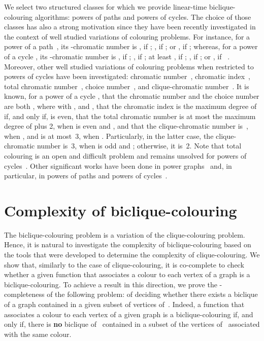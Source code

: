 \documentclass{article}
\begin{document}
We select two structured
classes for which we provide linear-time biclique-colouring algorithms:
powers of paths and powers of cycles. The choice of those classes has also
a strong motivation since they have been recently investigated in the context of
well studied variations of colouring problems. 
For instance, for a power of a path~, its -chromatic number is , if ; , if ; or , if ; whereas, for a power of a cycle
, its -chromatic number is , if ; , if ; at least , if ; , if ; or , if ~\cite{MR1979111}. Moreover, other well
studied variations of colouring problems when restricted to powers of cycles have been
investigated: chromatic number~\cite{MR1974376}, chromatic
index~\cite{meidanis}, total chromatic number~\cite{MR2303972}, choice
number~\cite{MR1974376}, and clique-chromatic number~\cite{MR2570638}.
It is known, for a power of a cycle , that
the chromatic number and the choice number are both , where  with ,  and , that the chromatic index is the maximum degree of  if, and only if,
 is even, that the total chromatic number is at most the maximum degree of
 plus 2, when  is even and , and that the
clique-chromatic number is~, when , and is at most~3, when .
Particularly, in the latter case, the clique-chromatic number is~3, when  is
odd and ; otherwise, it is~2. Note that total colouring is an open
and difficult problem and remains unsolved for powers of cycles~\cite{MR2303972}. Other
significant works have been done in power
graphs~\cite{MR1454439,MR2423405} and, in particular, in powers of
paths and powers of
cycles~\cite{MR1018529,MR1172679,MR2083449,MR2774114,MR1633075,MR2255625}.

\section{Complexity of biclique-colouring}

The biclique-colouring problem is a variation of the clique-colouring problem. Hence,
it is natural to investigate the complexity of biclique-colouring based on the
tools that were developed to determine the complexity of clique-colouring. 
We show that, similarly to the case of clique-colouring, it is
co-complete to check whether a given function that associates a
colour to each vertex of a graph is a biclique-colouring.
To achieve a result in this direction, we prove the -completeness
of the following problem: of deciding whether there exists a biclique of a
graph  contained in a given subset of vertices of~. Indeed, a function
that associates a colour to each vertex of a given graph  is a
biclique-colouring if, and only if, there is {\bf no} biclique of~
contained in a subset of the vertices of~ associated with the same colour.
\end{document}
